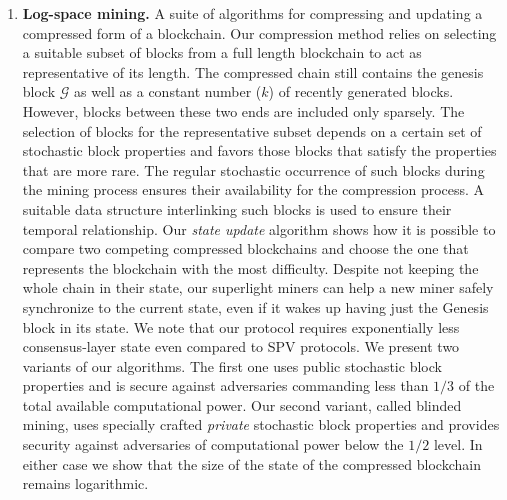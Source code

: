 \begin{enumerate}[wide, labelwidth=!, labelindent=0pt, label=(\roman*)]
  \item \textbf{Log-space mining.}
A suite of algorithms for compressing and updating a compressed form
of a blockchain. Our compression method relies on selecting a suitable
subset of blocks from a full length blockchain to act as representative
of its length. The compressed chain still
contains the genesis block $\mathcal{G}$ as well as a constant number ($k$) of
recently generated blocks. However, blocks between these two ends are included
only sparsely. The selection of blocks for the representative subset
depends on a certain set of stochastic block properties
and favors those blocks that satisfy the properties that are more rare.
The regular stochastic occurrence of such blocks during
the mining process ensures their availability for the compression
process. A suitable data structure interlinking such blocks is used
to ensure their temporal relationship. Our \emph{state update} algorithm
shows how it is possible to compare two competing compressed blockchains
and choose the one that represents the blockchain with the most difficulty.
Despite not keeping the whole chain in
their state, our superlight miners can help a new miner safely synchronize to
the current state, even if it wakes up having just the Genesis block in its
state. We note that our protocol requires exponentially less consensus-layer
state even compared to SPV protocols.
We present two variants of our algorithms. The first one
uses public stochastic block properties and is secure
against adversaries commanding less than $1/3$ of the total available
computational power. Our second variant, called blinded mining,
uses specially crafted
{\em private} stochastic block properties and provides security
against adversaries of computational power below the $1/2$ level.
In either case we show that the size of the state of the compressed
blockchain remains logarithmic.


\end{enumerate}
